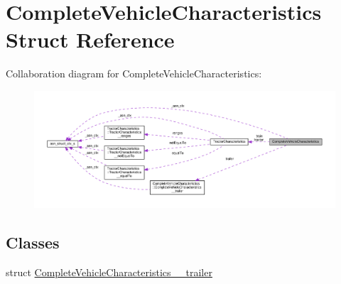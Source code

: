 \hypertarget{structCompleteVehicleCharacteristics}{}\section{Complete\+Vehicle\+Characteristics Struct Reference}
\label{structCompleteVehicleCharacteristics}


Collaboration diagram for Complete\+Vehicle\+Characteristics\+:\nopagebreak
\begin{figure}[H]
\begin{center}
\leavevmode
\includegraphics[width=350pt]{structCompleteVehicleCharacteristics__coll__graph}
\end{center}
\end{figure}
\subsection*{Classes}
\begin{DoxyCompactItemize}
\item 
struct \hyperlink{structCompleteVehicleCharacteristics_1_1CompleteVehicleCharacteristics____trailer}{Complete\+Vehicle\+Characteristics\+\_\+\+\_\+trailer}
\end{DoxyCompactItemize}
